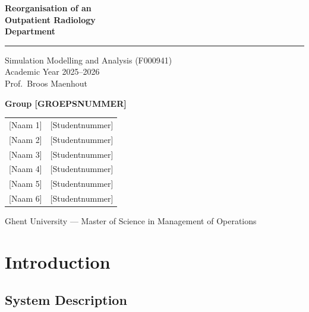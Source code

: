 \documentclass[12pt, a4paper]{article}
\begin{document}
\begin{titlepage}
    \centering
    \vspace*{2cm}
    {\fontsize{28}{34}\selectfont\bfseries\color{ugblue}
        Reorganisation of an\\[4pt] Outpatient Radiology\\[4pt] Department\par}
    \vspace{0.8cm}
    \textcolor{ugblue}{\rule{0.7\linewidth}{1.5pt}}
    \vspace{0.6cm}

    {\large Simulation Modelling and Analysis (F000941)}\\[4pt]
    {\large Academic Year 2025--2026}\\[4pt]
    {\large Prof.\ Broos Maenhout}

    \vspace{1.2cm}
    {\large \textbf{Group [GROEPSNUMMER]}}\\[0.5cm]
    \begin{tabular}{ll}
        {[Naam 1]} & {[Studentnummer]} \\
        {[Naam 2]} & {[Studentnummer]} \\
        {[Naam 3]} & {[Studentnummer]} \\
        {[Naam 4]} & {[Studentnummer]} \\
        {[Naam 5]} & {[Studentnummer]} \\
        {[Naam 6]} & {[Studentnummer]} \\
    \end{tabular}

    \vfill
    {\normalsize Ghent University --- Master of Science in Management of Operations}
\end{titlepage}

\tableofcontents
\newpage

\section{Introduction}

\subsection{System Description}
\end{document}
